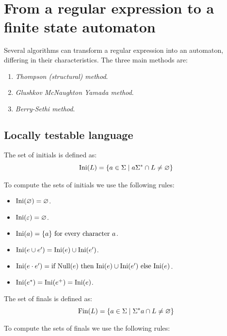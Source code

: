 \section{From a regular expression to a finite state automaton}

Several algorithms can transform a regular expression into an automaton, differing in their characteristics. 
The three main methods are:
\begin{enumerate}
    \item \textit{Thompson (structural) method}.
    \item \textit{Glushkov McNaughton Yamada method}.
    \item \textit{Berry-Sethi method}.
\end{enumerate}

\subsection{Locally testable language}
\begin{definition}
    The set of initials is defined as: 
    \[\textnormal{Ini}(L)=\{a \in \Sigma \mid  a\Sigma^{\ast}\cap L \neq \varnothing\}\]
\end{definition}
To compute the sets of initials we use the following rules: 
\begin{itemize}
    \item $\textnormal{Ini}(\varnothing)=\varnothing$.
    \item $\textnormal{Ini}(\varepsilon)=\varnothing$.
    \item $\textnormal{Ini}(a)=\{a\} \textnormal{ for every character }a$.
    \item $\textnormal{Ini}(e \cup e^{\prime})=\textnormal{Ini}(e) \cup \textnormal{Ini}(e^{\prime})$.
    \item $\textnormal{Ini}(e \cdot e^{\prime})=\textnormal{if Null}(e) \textnormal{ then Ini}(e)\cup\textnormal{Ini}(e^{\prime}) \textnormal{ else Ini}(e)$.
    \item $\textnormal{Ini}(e^{\ast})=\textnormal{Ini}(e^{+})=\textnormal{Ini}(e)$.
\end{itemize}
\begin{definition}
    The set of finals is defined as: 
    \[\textnormal{Fin}(L)=\{a \in \Sigma \mid  \Sigma^{\ast}a\cap L \neq \varnothing\}\]
\end{definition}
To compute the sets of finals we use the following rules: 
